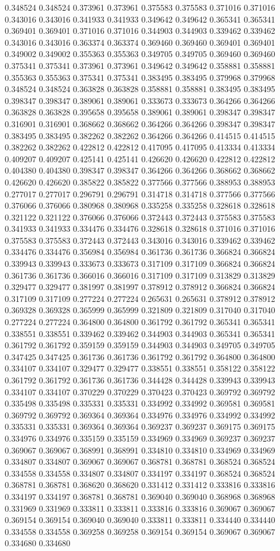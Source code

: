 0.348524 0.348524 0.373961 0.373961 0.375583 0.375583 0.371016 0.371016 0.343016 0.343016 0.341933 0.341933 0.349642 0.349642 0.365341 0.365341 0.369401 0.369401 0.371016 0.371016 0.344903 0.344903 0.339462 0.339462 0.343016 0.343016 0.363374 0.363374 0.369460 0.369460 0.369401 0.369401 0.349002 0.349002 0.355363 0.355363 0.349705 0.349705 0.369460 0.369460 0.375341 0.375341 0.373961 0.373961 0.349642 0.349642 0.358881 0.358881 0.355363 0.355363 0.375341 0.375341 0.383495 0.383495 0.379968 0.379968 0.348524 0.348524 0.363828 0.363828 0.358881 0.358881 0.383495 0.383495 0.398347 0.398347 0.389061 0.389061 0.333673 0.333673 0.364266 0.364266 0.363828 0.363828 0.395658 0.395658 0.389061 0.389061 0.398347 0.398347 0.316901 0.316901 0.368662 0.368662 0.364266 0.364266 0.398347 0.398347 0.383495 0.383495 0.382262 0.382262 0.364266 0.364266 0.414515 0.414515 0.382262 0.382262 0.422812 0.422812 0.417095 0.417095 0.413334 0.413334 0.409207 0.409207 0.425141 0.425141 0.426620 0.426620 0.422812 0.422812 0.404380 0.404380 0.398347 0.398347 0.364266 0.364266 0.368662 0.368662 0.426620 0.426620 0.385822 0.385822 0.377566 0.377566 0.388953 0.388953 0.277017 0.277017 0.296791 0.296791 0.314718 0.314718 0.377566 0.377566 0.376066 0.376066 0.380968 0.380968 0.335258 0.335258 0.328618 0.328618 0.321122 0.321122 0.376066 0.376066 0.372443 0.372443 0.375583 0.375583 0.341933 0.341933 0.334476 0.334476 0.328618 0.328618 0.371016 0.371016 0.375583 0.375583 0.372443 0.372443 0.343016 0.343016 0.339462 0.339462 0.334476 0.334476 0.356984 0.356984 0.361736 0.361736 0.366824 0.366824 0.339943 0.339943 0.333673 0.333673 0.317109 0.317109 0.366824 0.366824 0.361736 0.361736 0.366016 0.366016 0.317109 0.317109 0.313829 0.313829 0.329477 0.329477 0.381997 0.381997 0.378912 0.378912 0.366824 0.366824 0.317109 0.317109 0.277224 0.277224 0.265631 0.265631 0.378912 0.378912 0.369328 0.369328 0.365999 0.365999 0.321809 0.321809 0.317040 0.317040 0.277224 0.277224 0.364800 0.364800 0.361792 0.361792 0.365341 0.365341 0.338551 0.338551 0.339462 0.339462 0.344903 0.344903 0.365341 0.365341 0.361792 0.361792 0.359159 0.359159 0.344903 0.344903 0.349705 0.349705 0.347425 0.347425 0.361736 0.361736 0.361792 0.361792 0.364800 0.364800 0.334107 0.334107 0.329477 0.329477 0.338551 0.338551 0.358122 0.358122 0.361792 0.361792 0.361736 0.361736 0.344428 0.344428 0.339943 0.339943 0.334107 0.334107 0.370229 0.370229 0.370423 0.370423 0.369792 0.369792 0.335498 0.335498 0.335331 0.335331 0.334992 0.334992 0.369581 0.369581 0.369792 0.369792 0.369364 0.369364 0.334976 0.334976 0.334992 0.334992 0.335331 0.335331 0.369364 0.369364 0.369237 0.369237 0.369175 0.369175 0.334976 0.334976 0.335159 0.335159 0.334969 0.334969 0.369237 0.369237 0.369067 0.369067 0.368991 0.368991 0.334810 0.334810 0.334969 0.334969 0.334807 0.334807 0.369067 0.369067 0.368781 0.368781 0.368524 0.368524 0.334558 0.334558 0.334807 0.334807 0.334197 0.334197 0.368524 0.368524 0.368781 0.368781 0.368620 0.368620 0.331412 0.331412 0.333816 0.333816 0.334197 0.334197 0.368781 0.368781 0.369040 0.369040 0.368968 0.368968 0.331969 0.331969 0.333811 0.333811 0.333816 0.333816 0.369067 0.369067 0.369154 0.369154 0.369040 0.369040 0.333811 0.333811 0.334440 0.334440 0.334558 0.334558 0.369258 0.369258 0.369154 0.369154 0.369067 0.369067 0.334680 0.334680 